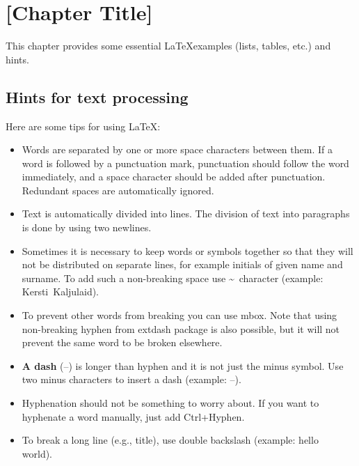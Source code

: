 \section{[Chapter Title]}

This chapter provides some essential \LaTeX examples (lists, tables,
etc.) and hints.

\subsection{Hints for text processing}

Here are some tips for using \LaTeX:

\begin{itemize}
\item Words are separated by one or       more space characters between
  them. If a word is followed by a punctuation mark, punctuation should
  follow the word immediately, and a space character should be added
  after punctuation. Redundant
  spaces      are
  automatically             ignored.

\item Text is automatically divided into lines. The division of text
  into paragraphs is done by using two newlines.

\item Sometimes it is necessary to keep words or symbols together so
  that they will not be distributed on separate lines, for example
  initials of given name and surname. To add such a non-breaking space
  use \textasciitilde\ character (example: Kersti~Kaljulaid).

\item To prevent other words from breaking you can use mbox. Note
  that using \mbox{non-breaking} hyphen from extdash package is also
  possible, but it will not prevent the same word to be broken
  elsewhere.

\item \textbf{A dash} (--) is longer than hyphen and it is not just
  the minus symbol. Use two minus characters to insert a dash
  (example: --).

\item Hyphenation should not be something to worry about. If you want to hyphenate a
  word manually, just add Ctrl+Hyphen.

\item To break a long line (e.g., title), use double backslash (example: hello\\world).
\end{itemize}

